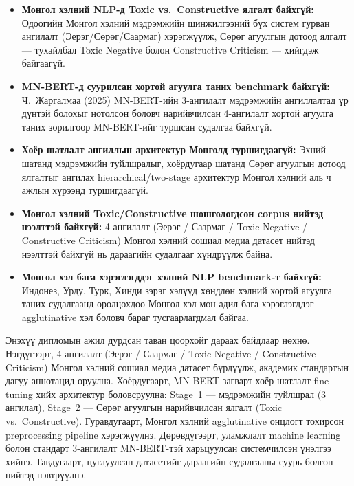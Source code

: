 \begin{itemize}
  \item \textbf{Монгол хэлний NLP-д Toxic vs.\ Constructive ялгалт байхгүй:}
        Одоогийн Монгол хэлний мэдрэмжийн шинжилгээний бүх систем гурван
        ангилалт (Эерэг/Сөрөг/Саармаг) хэрэгжүүлж, Сөрөг агуулгын дотоод
        ялгалт --- тухайлбал Toxic Negative болон Constructive Criticism ---
        хийгдэж байгаагүй.

  \item \textbf{MN-BERT-д суурилсан хортой агуулга таних benchmark байхгүй:}
        Ч.~Жаргалмаа (2025) MN-BERT-ийн 3-ангилалт мэдрэмжийн ангиллалтад
        үр дүнтэй болохыг нотолсон боловч нарийвчилсан 4-ангилалт хортой
        агуулга таних зорилгоор MN-BERT-ийг туршсан судалгаа байхгүй.

  \item \textbf{Хоёр шатлалт ангиллын архитектур Монголд туршигдаагүй:}
        Эхний шатанд мэдрэмжийн туйлшралыг, хоёрдугаар шатанд Сөрөг
        агуулгын дотоод ялгалтыг ангилах hierarchical/two-stage архитектур
        Монгол хэлний аль ч ажлын хүрээнд туршигдаагүй.

  \item \textbf{Монгол хэлний Toxic/Constructive шошгологдсон corpus нийтэд
        нээлттэй байхгүй:} 4-ангилалт (Эерэг / Саармаг / Toxic Negative /
        Constructive Criticism) Монгол хэлний сошиал медиа датасет нийтэд
        нээлттэй байхгүй нь дараагийн судалгааг хүндрүүлж байна.

  \item \textbf{Монгол хэл бага хэрэглэгддэг хэлний NLP benchmark-т байхгүй:}
        Индонез, Урду, Турк, Хинди зэрэг хэлүүд хөндлөн хэлний хортой агуулга
        таних судалгаанд оролцохдоо Монгол хэл мөн адил бага хэрэглэгддэг
        agglutinative хэл боловч бараг тусгаарлагдмал байгаа.
\end{itemize}

Энэхүү дипломын ажил дурдсан таван цоорхойг дараах байдлаар нөхнө. Нэгдүгээрт,
4-ангилалт (Эерэг / Саармаг / Toxic Negative / Constructive Criticism) Монгол
хэлний сошиал медиа датасет бүрдүүлж, академик стандартын дагуу аннотацид
оруулна. Хоёрдугаарт, MN-BERT загварт хоёр шатлалт fine-tuning хийх архитектур
боловсруулна: Stage~1 --- мэдрэмжийн туйлшрал (3 ангилал), Stage~2 --- Сөрөг
агуулгын нарийвчилсан ялгалт (Toxic vs.\ Constructive). Гуравдугаарт, Монгол
хэлний agglutinative онцлогт тохирсон preprocessing pipeline хэрэгжүүлнэ.
Дөрөвдүгээрт, уламжлалт machine learning болон стандарт 3-ангилалт MN-BERT-тэй
харьцуулсан системчилсэн үнэлгээ хийнэ. Тавдугаарт, цуглуулсан датасетийг
дараагийн судалгааны суурь болгон нийтэд нэвтрүүлнэ.

